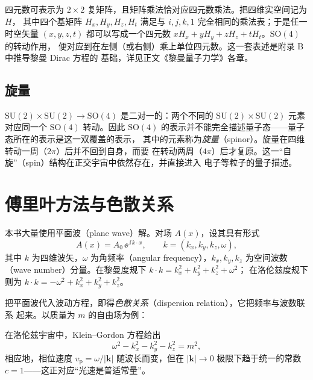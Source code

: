 四元数可表示为 $2\times 2$ 复矩阵，且矩阵乘法恰对应四元数乘法。把四维实空间记为 $H$，
其中四个基矩阵 $H_x,H_y,H_z,H_t$ 满足与 $i,j,k,1$ 完全相同的乘法表；于是任一时空矢量
$(x,y,z,t)$ 都可以写成一个四元数 $xH_x+yH_y+zH_z+tH_t$。$\mathrm{SO}(4)$ 的转动作用，
便对应到在左侧（或右侧）乘上单位四元数。这一套表述是附录 B 中推导黎曼 Dirac 方程的
基础，详见正文《黎曼量子力学》各章。

\subsection{旋量}

$\mathrm{SU}(2)\times \mathrm{SU}(2)\to \mathrm{SO}(4)$ 是二对一的：两个不同的
$\mathrm{SU}(2)\times\mathrm{SU}(2)$ 元素对应同一个 $\mathrm{SO}(4)$ 转动。因此
$\mathrm{SO}(4)$ 的表示并不能完全描述量子态——量子态所在的表示是这一双覆盖的表示，
其中的元素称为\emph{旋量}（spinor）。旋量在四维转动一周（$2\pi$）后并不回到自身，而要
在转动两周（$4\pi$）后才复原。这一“自旋”（spin）结构在正交宇宙中依然存在，并直接进入
电子等粒子的量子描述。

\section{傅里叶方法与色散关系}

本书大量使用平面波（plane wave）解。对场 $A(x)$，设其具有形式
\begin{equation}
A(x)=A_0\, \ee^{\,\ii\, k\cdot x},\qquad k=(k_x,k_y,k_z,\omega),
\end{equation}
其中 $k$ 为四维波矢，$\omega$ 为角频率（angular frequency），$k_x,k_y,k_z$ 为空间波数
（wave number）分量。在黎曼度规下 $k\cdot k=k_x^{2}+k_y^{2}+k_z^{2}+\omega^{2}$；
在洛伦兹度规下则为 $k\cdot k=-\omega^{2}+k_x^{2}+k_y^{2}+k_z^{2}$。

把平面波代入波动方程，即得\emph{色散关系}（dispersion relation），它把频率与波数联系
起来。以质量为 $m$ 的自由场为例：

在洛伦兹宇宙中，Klein–Gordon 方程给出
\begin{equation}
\omega^{2}-k_x^{2}-k_y^{2}-k_z^{2}=m^{2},
\tag{A.4}
\end{equation}
相应地，相位速度 $v_{\mathrm p}=\omega/|\mathbf{k}|$ 随波长而变，但在 $|\mathbf{k}|\to 0$
极限下趋于统一的常数 $c=1$——这正对应“光速是普适常量”。

